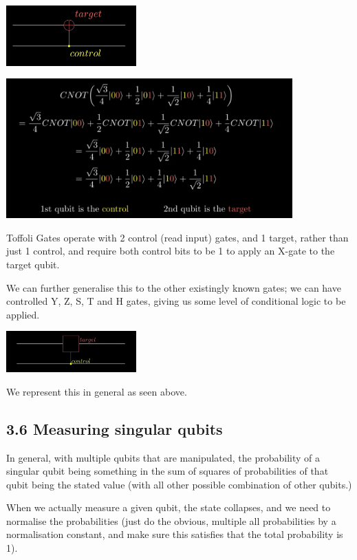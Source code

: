\documentclass[10pt,oneside,a4paper]{article}
\begin{document}
\begin{center}
\includegraphics[width=5cm]{3}

\includegraphics[width=11cm]{4}
\end{center}

Toffoli Gates operate with 2 control (read input) gates, and 1 target, rather than just 1 control, and require both control bits to be 1 to apply an X-gate to the target qubit.

We can further generalise this to the other existingly known gates; we can have controlled Y, Z, S, T and H gates, giving us some level of conditional logic to be applied. 

\begin{center}
\includegraphics[width=5cm]{5}
\end{center}

We represent this in general as seen above. 

\subsection*{3.6 Measuring singular qubits}

In general, with multiple qubits that are manipulated, the probability of a singular qubit being something in the sum of squares of probabilities of that qubit being the stated value (with all other possible combination of other qubits.)

When we actually measure a given qubit, the state collapses, and we need to normalise the probabilities (just do the obvious, multiple all probabilities by a normalisation constant, and make sure this satisfies that the total probability is 1).
\end{document}
